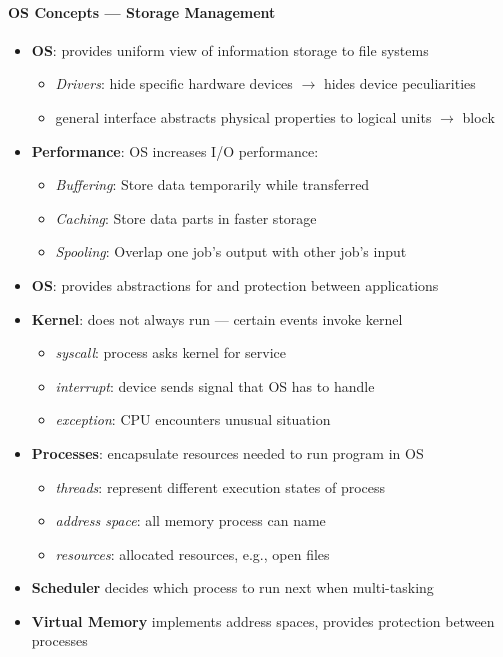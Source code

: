 \paragraph{OS Concepts --- Storage Management}
\begin{itemize}
	\item \textbf{OS}: provides uniform view of information storage to file systems
	\begin{itemize}
		\item \emph{Drivers}: hide specific hardware devices $ \to $ hides device peculiarities
		\item general interface abstracts physical properties to logical units $ \to $ block
	\end{itemize}
	\item \textbf{Performance}: OS increases I/O performance:
	\begin{itemize}
		\item \emph{Buffering}: Store data temporarily while transferred
		\item \emph{Caching}: Store data parts in faster storage
		\item \emph{Spooling}: Overlap one job's output with other job's input
	\end{itemize}
\end{itemize}

\begin{summary}
	\begin{itemize}
		\item \textbf{OS}: provides abstractions for and protection between applications
		\item \textbf{Kernel}: does not always run --- certain events invoke kernel
		\begin{itemize}
			\item \emph{syscall}: process asks kernel for service
			\item \emph{interrupt}: device sends signal that OS has to handle
			\item \emph{exception}: CPU encounters unusual situation
		\end{itemize}
		\item \textbf{Processes}: encapsulate resources needed to run program in OS
		\begin{itemize}
			\item \emph{threads}: represent different execution states of process
			\item \emph{address space}: all memory process can name
			\item \emph{resources}: allocated resources, e.g., open files
		\end{itemize}
		\item \textbf{Scheduler} decides which process to run next when multi-tasking
		\item \textbf{Virtual Memory} implements address spaces, provides protection between processes
	\end{itemize}
\end{summary}